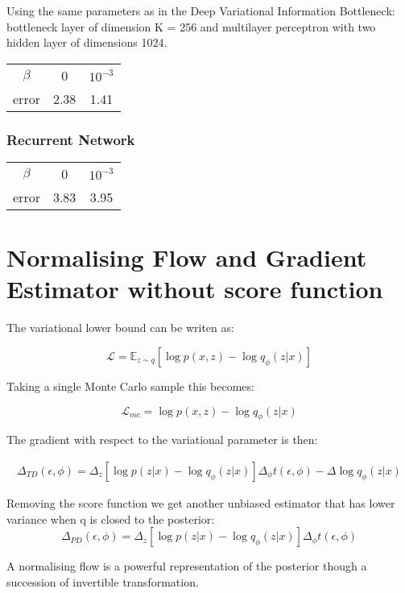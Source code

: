 \documentclass[a4paper]{article}
\begin{document}
Using the same parameters as in the Deep Variational Information Bottleneck: bottleneck layer of dimension K = 256 and multilayer perceptron with two hidden layer of dimensions 1024.

\begin{center}
\begin{tabular}{ c | c c }
 $\beta$ & 0 & $10^{-3}$ \\ 
 error &  2.38 &  1.41 \\  
\end{tabular}
\end{center}

\subsubsection{Recurrent Network}

\begin{center}
\begin{tabular}{ c | c c }
 $\beta$ & 0 & $10^{-3}$ \\ 
 error & 3.83 &  3.95 \\  
\end{tabular}
\end{center}

\section{Normalising Flow and Gradient Estimator without score function}

The variational lower bound can be writen as:

$$ \mathcal{L} = \mathbb{E}_{z \sim q}[\log p(x, z) - \log q_\phi(z|x)] $$

Taking a single Monte Carlo sample this becomes:

$$ \mathcal{L}_{mc} = \log p(x, z) - \log q_\phi(z|x) $$

The gradient with respect to the variational parameter is then:

\begin{align}
\Delta_{TD}(\epsilon, \phi) = \Delta_z[\log p(z|x) -  \log q_\phi(z|x)] \Delta_\phi t(\epsilon, \phi) - \Delta \log q_\phi(z|x)
\end{align}

Removing the score function we get another unbiased estimator that has lower variance when q is closed to the posterior:
$$ \Delta_{PD}(\epsilon, \phi) =  \Delta_z[\log p(z|x) -  \log q_\phi(z|x)] \Delta_\phi t(\epsilon, \phi)$$

A normalising flow is a powerful representation of the posterior though a succession of invertible transformation.
\end{document}
